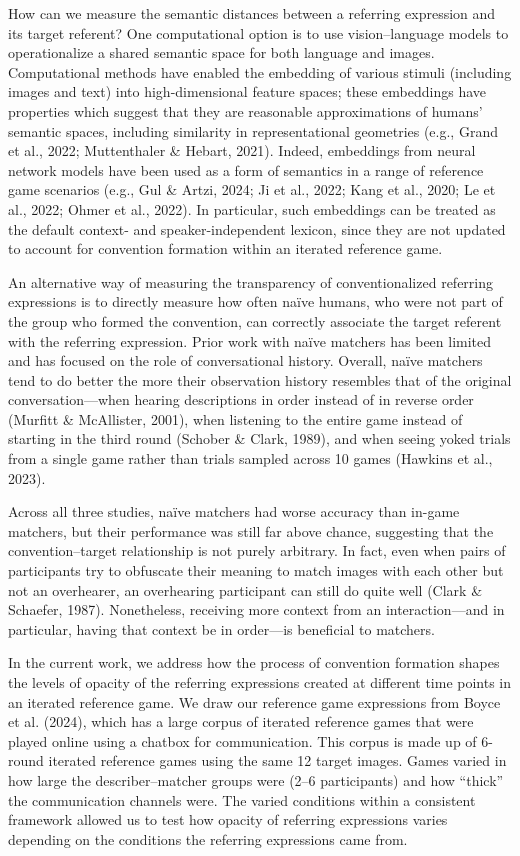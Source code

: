 \documentclass[10pt, letterpaper]{article}
\begin{document}
How can we measure the semantic distances between a referring expression
and its target referent? One computational option is to use
vision--language models to operationalize a shared semantic space for
both language and images. Computational methods have enabled the
embedding of various stimuli (including images and text) into
high-dimensional feature spaces; these embeddings have properties which
suggest that they are reasonable approximations of humans' semantic
spaces, including similarity in representational geometries (e.g., Grand
et al., 2022; Muttenthaler \& Hebart, 2021). Indeed, embeddings from
neural network models have been used as a form of semantics in a range
of reference game scenarios (e.g., Gul \& Artzi, 2024; Ji et al., 2022;
Kang et al., 2020; Le et al., 2022; Ohmer et al., 2022). In particular,
such embeddings can be treated as the default context- and
speaker-independent lexicon, since they are not updated to account for
convention formation within an iterated reference game.

An alternative way of measuring the transparency of conventionalized
referring expressions is to directly measure how often naïve humans, who
were not part of the group who formed the convention, can correctly
associate the target referent with the referring expression. Prior work
with naïve matchers has been limited and has focused on the role of
conversational history. Overall, naïve matchers tend to do better the
more their observation history resembles that of the original
conversation---when hearing descriptions in order instead of in reverse
order (Murfitt \& McAllister, 2001), when listening to the entire game
instead of starting in the third round (Schober \& Clark, 1989), and
when seeing yoked trials from a single game rather than trials sampled
across 10 games (Hawkins et al., 2023).

Across all three studies, naïve matchers had worse accuracy than in-game
matchers, but their performance was still far above chance, suggesting
that the convention--target relationship is not purely arbitrary. In
fact, even when pairs of participants try to obfuscate their meaning to
match images with each other but not an overhearer, an overhearing
participant can still do quite well (Clark \& Schaefer, 1987).
Nonetheless, receiving more context from an interaction---and in
particular, having that context be in order---is beneficial to matchers.

In the current work, we address how the process of convention formation
shapes the levels of opacity of the referring expressions created at
different time points in an iterated reference game. We draw our
reference game expressions from Boyce et al. (2024), which has a large
corpus of iterated reference games that were played online using a
chatbox for communication. This corpus is made up of 6-round iterated
reference games using the same 12 target images. Games varied in how
large the describer--matcher groups were (2--6 participants) and how
``thick'' the communication channels were. The varied conditions within
a consistent framework allowed us to test how opacity of referring
expressions varies depending on the conditions the referring expressions
came from.
\end{document}
